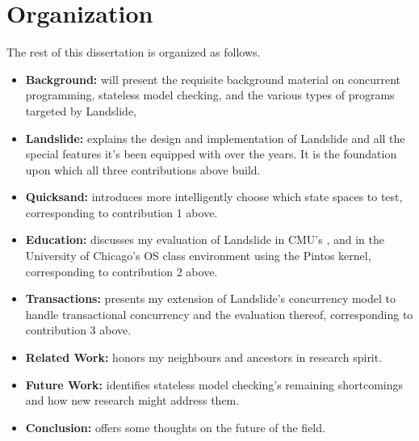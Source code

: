 
\section{Organization}

The rest of this dissertation is organized as follows.

\begin{itemize}
	\item {\bf Background:}  will present the requisite background material on concurrent programming, stateless model checking, and the various types of programs targeted by Landslide,
	\item {\bf Landslide:}  explains the design and implementation of Landslide
		and all the special features it's been equipped with over the years.
		It is the foundation upon which all three contributions above build.
	\item {\bf Quicksand:}  introduces
		more intelligently choose which state spaces to test, corresponding to contribution 1 above.
	\item {\bf Education:}  discusses my evaluation of Landslide
		in CMU's
		,
		and in the University of Chicago's
		OS class environment using the Pintos kernel,
		corresponding to contribution 2 above.
	\item {\bf Transactions:}  presents my extension of Landslide's concurrency model to handle transactional concurrency and the evaluation thereof, corresponding to contribution 3 above.
	\item {\bf Related Work:}  honors my neighbours and ancestors in research spirit.
	\item {\bf Future Work:}  identifies stateless model checking's remaining shortcomings and how new research might address them.
	\item {\bf Conclusion:}  offers some thoughts on the future of the field.
\end{itemize}

